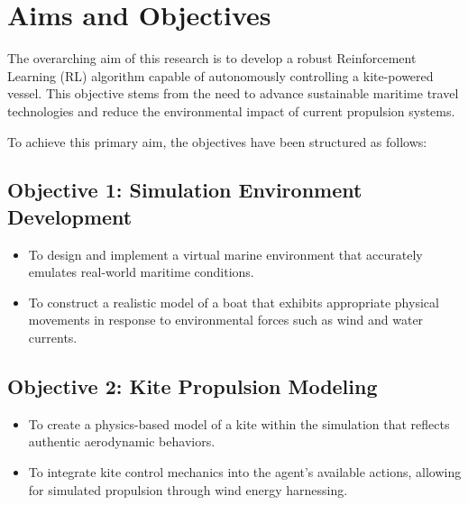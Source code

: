 

\section{Aims and Objectives}

The overarching aim of this research is to develop a robust Reinforcement Learning (RL) algorithm capable of autonomously controlling a kite-powered vessel. This objective stems from the need to advance sustainable maritime travel technologies and reduce the environmental impact of current propulsion systems.

To achieve this primary aim, the objectives have been structured as follows:

\subsection*{Objective 1: Simulation Environment Development}
\begin{itemize}
    \item To design and implement a virtual marine environment that accurately emulates real-world maritime conditions.
    \item To construct a realistic model of a boat that exhibits appropriate physical movements in response to environmental forces such as wind and water currents.
\end{itemize}

\subsection*{Objective 2: Kite Propulsion Modeling}
\begin{itemize}
    \item To create a physics-based model of a kite within the simulation that reflects authentic aerodynamic behaviors.
    \item To integrate kite control mechanics into the agent’s available actions, allowing for simulated propulsion through wind energy harnessing.
\end{itemize}

